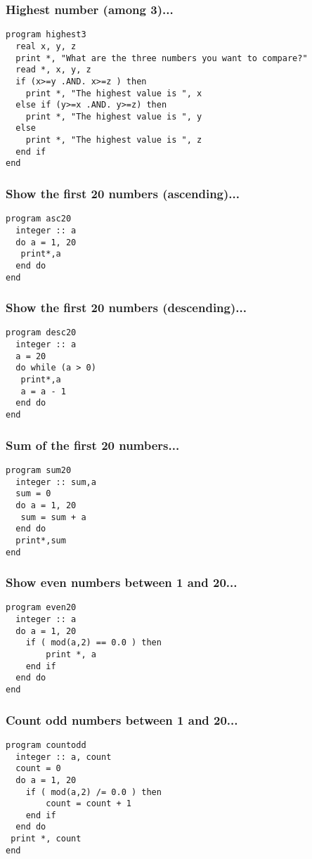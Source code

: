 \documentclass[xcolor=dvipsnames,dvip,notes=show,table]{beamer}
\begin{document}
\begin{frame}[fragile]
\frametitle{Highest number (among 3)...}

\scriptsize
\begin{lstlisting}
program highest3
  real x, y, z
  print *, "What are the three numbers you want to compare?"
  read *, x, y, z
  if (x>=y .AND. x>=z ) then 
    print *, "The highest value is ", x
  else if (y>=x .AND. y>=z) then
    print *, "The highest value is ", y
  else 
    print *, "The highest value is ", z
  end if
end
\end{lstlisting}
\end{frame}

\begin{frame}[fragile]
\frametitle{Show the first 20 numbers (ascending)...}

\scriptsize
\begin{lstlisting}
program asc20
  integer :: a
  do a = 1, 20
   print*,a
  end do
end
\end{lstlisting}
\end{frame}


\begin{frame}[fragile]
\frametitle{Show the first 20 numbers (descending)...}

\scriptsize
\begin{lstlisting}
program desc20
  integer :: a
  a = 20
  do while (a > 0) 
   print*,a
   a = a - 1
  end do
end
\end{lstlisting}
\end{frame}


\begin{frame}[fragile]
\frametitle{Sum of the first 20 numbers...}

\scriptsize
\begin{lstlisting}
program sum20
  integer :: sum,a
  sum = 0
  do a = 1, 20
   sum = sum + a    
  end do
  print*,sum
end
\end{lstlisting}
\end{frame}


\begin{frame}[fragile]
\frametitle{Show even numbers between 1 and 20...}

\scriptsize
\begin{lstlisting}
program even20
  integer :: a
  do a = 1, 20
    if ( mod(a,2) == 0.0 ) then 
    	print *, a
    end if	
  end do
end
\end{lstlisting}
\end{frame}

\begin{frame}[fragile]
\frametitle{Count odd numbers between 1 and 20...}

\scriptsize
\begin{lstlisting}
program countodd
  integer :: a, count
  count = 0
  do a = 1, 20
    if ( mod(a,2) /= 0.0 ) then 
    	count = count + 1 
    end if	
  end do
 print *, count 
end
\end{lstlisting}
\end{frame}
\end{document}
